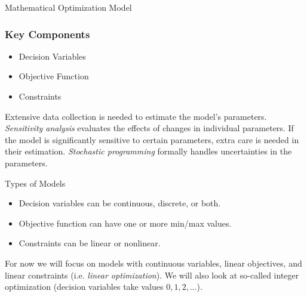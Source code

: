 \documentclass[
    NAME={Dr. Helga Ingimundardóttir},
    EMAIL={helgaingim@hi.is},
    FACULTY={Industrial Engineering},
    TITLE={Linear Optimization},
    SUBTITLE={Fundamentals and Applications},
    SEMINAR={VÉL113F},
    DATE={Design and Optimization}
]{HI-latex/hi-beamer}
\begin{document}
    \begin{frame}{Mathematical Optimization Model}
        \frametitle{Key Components}
        \begin{itemize}
            \item Decision Variables
            \item Objective Function
            \item Constraints
        \end{itemize}
        \bigskip
        Extensive data collection is needed to estimate the model's parameters.
        \emph{Sensitivity analysis} evaluates the effects of changes in individual parameters.
        If the model is significantly sensitive to certain parameters, extra care is needed in their estimation.
        \emph{Stochastic programming} formally handles uncertainties in the parameters.
    \end{frame}

    \begin{frame}{Types of Models}
        \begin{itemize}
            \item Decision variables can be continuous, discrete, or both.
            \item Objective function can have one or more min/max values.
            \item Constraints can be linear or nonlinear.
        \end{itemize}
        \bigskip
        For now we will focus on models with continuous variables, linear objectives, and linear constraints (i.e. \emph{linear
        optimization}). We will also look at so-called integer optimization (decision variables take values \(0,1,2,\ldots\)).
    \end{frame}
\end{document}
